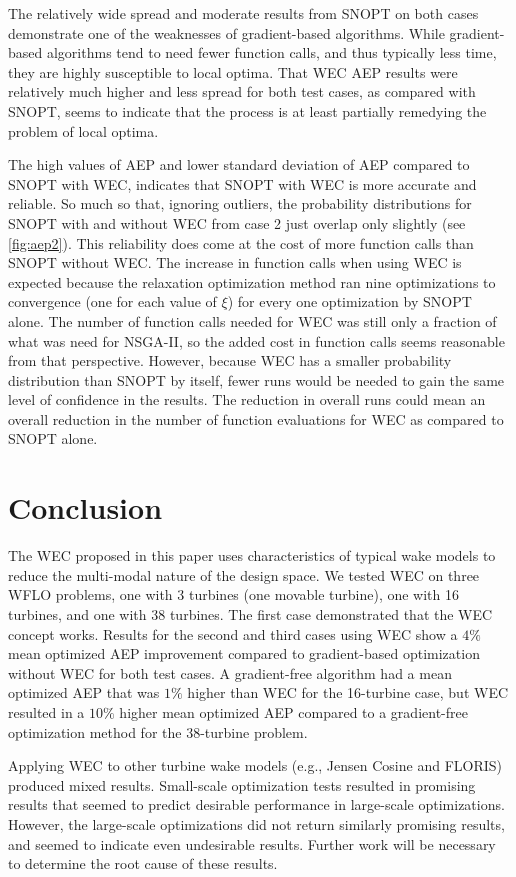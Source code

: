 \documentclass[a4paper]{jpconf}
\begin{document}
The relatively wide spread and moderate results from SNOPT on both cases demonstrate one of the weaknesses of gradient-based algorithms. While gradient-based algorithms tend to need fewer function calls, and thus typically less time, they are highly susceptible to local optima. That WEC AEP results were relatively much higher and less spread for both test cases, as compared with SNOPT, seems to indicate that the process is at least partially remedying the problem of local optima.

The high values of AEP and lower standard deviation of AEP compared to SNOPT with WEC, indicates that SNOPT with WEC is more accurate and reliable. So much so that, ignoring outliers, the probability distributions for SNOPT with and without WEC from case 2 just overlap only slightly (see \cref{fig:aep2}). This reliability does come at the cost of more function calls than SNOPT without WEC. The increase in function calls when using WEC is expected because the relaxation optimization method ran nine optimizations to convergence (one for each value of $\xi$) for every one optimization by SNOPT alone. The number of function calls needed for WEC was still only a fraction of what was need for NSGA-II, so the added cost in function calls seems reasonable from that perspective. However, because WEC has a smaller probability distribution than SNOPT by itself, fewer runs would be needed to gain the same level of confidence in the results. The reduction in overall runs could mean an overall reduction in the number of function evaluations for WEC as compared to SNOPT alone.

\section{Conclusion}
The WEC proposed in this paper uses characteristics of typical wake models to reduce the multi-modal nature of the design space. We tested WEC on three WFLO problems, one with 3 turbines (one movable turbine), one with 16 turbines, and one with 38 turbines. The first case demonstrated that the WEC concept works. Results for the second and third cases using WEC show a $4\%$ mean optimized AEP improvement compared to gradient-based optimization without WEC for both test cases. A gradient-free algorithm had a mean optimized AEP that was $1\%$ higher than WEC for the 16-turbine case, but WEC resulted in a $10\%$ higher mean optimized AEP compared to a gradient-free optimization method for the 38-turbine problem.

Applying WEC to other turbine wake models (e.g., Jensen Cosine and FLORIS) produced mixed results. Small-scale optimization tests resulted in promising results that seemed to predict desirable performance in large-scale optimizations. However, the large-scale optimizations did not return similarly promising results, and seemed to indicate even undesirable results. Further work will be necessary to determine the root cause of these results.
\end{document}
